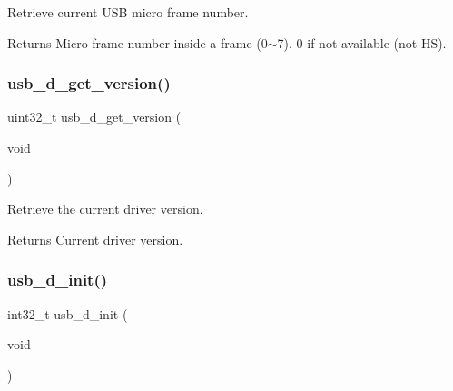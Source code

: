Retrieve current U\+SB micro frame number. 

\begin{DoxyReturn}{Returns}
Micro frame number inside a frame (0$\sim$7). 0 if not available (not HS). 
\end{DoxyReturn}
\mbox{\label{group__doc__driver__hal__usb__device_ga31a3689de8d913fb54c5ddf2d91840bb}} 
\subsubsection{\texorpdfstring{usb\+\_\+d\+\_\+get\+\_\+version()}{usb\_d\_get\_version()}}
{\footnotesize\ttfamily uint32\+\_\+t usb\+\_\+d\+\_\+get\+\_\+version (\begin{DoxyParamCaption}\item[{void}]{ }\end{DoxyParamCaption})}



Retrieve the current driver version. 

\begin{DoxyReturn}{Returns}
Current driver version. 
\end{DoxyReturn}
\mbox{\label{group__doc__driver__hal__usb__device_ga5f357667fb7640cea64b82cf1f4376c9}} 
\subsubsection{\texorpdfstring{usb\+\_\+d\+\_\+init()}{usb\_d\_init()}}
{\footnotesize\ttfamily int32\+\_\+t usb\+\_\+d\+\_\+init (\begin{DoxyParamCaption}\item[{void}]{ }\end{DoxyParamCaption})}



